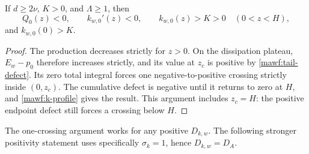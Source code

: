 \begin{proposition}
\label{mawf:monotone-proposition}
If \(d\ge2\nu\), \(K>0\), and \(\Lambda\ge1\), then
\begin{equation}
 Q_0(z)<0,\qquad k_{w,0}'(z)<0,\qquad
 k_{w,0}(z)>K>0\quad(0<z<H),
\end{equation}
and \(k_{w,0}(0)>K\).
\end{proposition}
\begin{proof}
The production decreases strictly for \(z>0\).
On the dissipation plateau, \(E_w-p_0\) therefore increases
strictly, and its value at \(z_c\) is positive by
\cref{mawf:tail-defect}. Its zero total integral forces one
negative-to-positive crossing strictly inside \((0,z_c)\).
The cumulative defect is negative until it returns to zero at
\(H\), and \cref{mawf:k-profile} gives the result.
This argument includes \(z_c=H\): the positive endpoint
defect still forces a crossing below \(H\).
\end{proof}
The one-crossing argument works for any positive \(D_{k,w}\).
The following stronger positivity statement uses specifically
\(\sigma_k=1\), hence \(D_{k,w}=D_A\).

